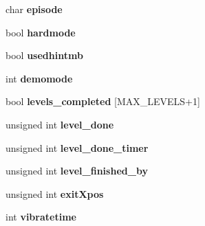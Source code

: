 \begin{DoxyCompactItemize}
\item 
\hypertarget{structst_level_control_a676d122ce5bd888019a89ddb55b680d0}{
char {\bfseries episode}}
\label{structst_level_control_a676d122ce5bd888019a89ddb55b680d0}

\item 
\hypertarget{structst_level_control_abc2542a7f0a48ba1f04b6ce17a0e65e1}{
bool {\bfseries hardmode}}
\label{structst_level_control_abc2542a7f0a48ba1f04b6ce17a0e65e1}

\item 
\hypertarget{structst_level_control_a7b73a7d99a21f524206fdb617818d364}{
bool {\bfseries usedhintmb}}
\label{structst_level_control_a7b73a7d99a21f524206fdb617818d364}

\item 
\hypertarget{structst_level_control_a764ea603c8b4a39d21d71faad818692f}{
int {\bfseries demomode}}
\label{structst_level_control_a764ea603c8b4a39d21d71faad818692f}

\item 
\hypertarget{structst_level_control_af8fc87577e761ea070da09dd58f2ba5e}{
bool {\bfseries levels\_\-completed} \mbox{[}MAX\_\-LEVELS+1\mbox{]}}
\label{structst_level_control_af8fc87577e761ea070da09dd58f2ba5e}

\item 
\hypertarget{structst_level_control_abdc2cf8bcc40e5d95893cb34f415feb8}{
unsigned int {\bfseries level\_\-done}}
\label{structst_level_control_abdc2cf8bcc40e5d95893cb34f415feb8}

\item 
\hypertarget{structst_level_control_ac1395c58929221fa832f25c93b610860}{
unsigned int {\bfseries level\_\-done\_\-timer}}
\label{structst_level_control_ac1395c58929221fa832f25c93b610860}

\item 
\hypertarget{structst_level_control_aee59f1eb34ad41b4e9b4b46413eded11}{
unsigned int {\bfseries level\_\-finished\_\-by}}
\label{structst_level_control_aee59f1eb34ad41b4e9b4b46413eded11}

\item 
\hypertarget{structst_level_control_ac4504cdaf54ff3270445331501d0b122}{
unsigned int {\bfseries exitXpos}}
\label{structst_level_control_ac4504cdaf54ff3270445331501d0b122}

\item 
\hypertarget{structst_level_control_af86c806c78702ac5199644d724eb6a2c}{
int {\bfseries vibratetime}}
\label{structst_level_control_af86c806c78702ac5199644d724eb6a2c}


\end{DoxyCompactItemize}
